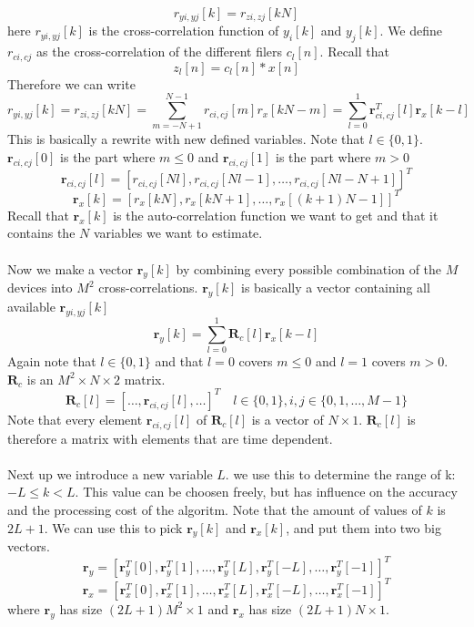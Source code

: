 \documentclass[oneside, a4paper, openany]{memoir}
\begin{document}
$$
r_{yi,yj}[k] = r_{zi,zj}[kN]
$$
here $r_{yi,yj}[k]$ is the cross-correlation function of $y_i[k]$ and $y_j[k]$.
We define $r_{ci,cj}$ as the cross-correlation of the different filers $c_l[n]$.
Recall that 
$$
z_l[n] = c_l[n]\ast x[n]
$$
Therefore we can write
$$
r_{yi,yj}[k] = r_{zi,zj}[kN] = \sum_{m=-N+1}^{N-1}r_{ci,cj}[m]r_x[kN-m] = \sum_{l=0}^1\mathbf{r}^T_{ci,cj}[l]\mathbf{r}_x[k-l]
$$
This is basically a rewrite with new defined variables. Note that $l \in \{0,1\}$. $\mathbf{r}_{ci,cj}[0]$ is the part where $m\leq 0$ and $\mathbf{r}_{ci,cj}[1]$ is the part where $m > 0$ 
$$
\mathbf{r}_{ci,cj}[l] = [r_{ci,cj}[Nl], r_{ci,cj}[Nl-1], \dots, r_{ci,cj}[Nl-N+1]]^T
$$
$$
\mathbf{r}_x[k]= [r_x[kN],r_x[kN+1],\dots,r_x[(k+1)N-1]]^T
$$
Recall that $\mathbf{r}_x[k]$ is the auto-correlation function we want to get and that it contains the $N$ variables we want to estimate.\\
\\
Now we make a vector $\mathbf{r}_y[k]$ by combining every possible combination of the $M$ devices into $M^2$ cross-correlations. $\mathbf{r}_y[k]$ is basically a vector containing all available $\mathbf{r}_{yi,yj}[k]$
$$
\mathbf{r}_y[k]=\sum_{l=0}^1\mathbf{R}_c[l]\mathbf{r}_x[k-l]
$$
Again note that $l \in \{0,1\}$ and that $l=0$ covers $m\leq 0$ and $l=1$ covers $m > 0$. $\mathbf{R}_c$ is an $M^2 \times N \times 2$ matrix.
$$
\mathbf{R}_c[l] = [\dots,\mathbf{r}_{ci,cj}[l],\dots]^T \quad l \in \{0,1\}, i,j \in \{0,1, \dots, M-1\}
$$
Note that every element $\mathbf{r}_{ci,cj}[l]$ of $\mathbf{R}_c[l]$ is a vector of $N \times 1$. $\mathbf{R}_c[l]$ is therefore a matrix with elements that are time dependent.\\
\\
Next up we introduce a new variable $L$. we use this to determine the range of k: $-L\leq k<L$. 
This value can be choosen freely, but has influence on the accuracy and the processing cost of the algoritm. 
Note that the amount of values of $k$ is $2L+1$. We can use this to pick $\mathbf{r}_y[k]$ and $\mathbf{r}_x[k]$, and put them into two big vectors.
$$
\mathbf{r}_y = [\mathbf{r}^T_y[0],\mathbf{r}^T_y[1],\dots,\mathbf{r}^T_y[L],\mathbf{r}^T_y[-L],\dots,\mathbf{r}^T_y[-1]]^T
$$
$$
\mathbf{r}_x = [\mathbf{r}^T_x[0],\mathbf{r}^T_x[1],\dots,\mathbf{r}^T_x[L],\mathbf{r}^T_x[-L],\dots,\mathbf{r}^T_x[-1]]^T
$$
where $\mathbf{r}_y$ has size $(2L+1)M^2\times 1$ and $\mathbf{r}_x$ has size $(2L+1)N \times 1$. \\
\end{document}
